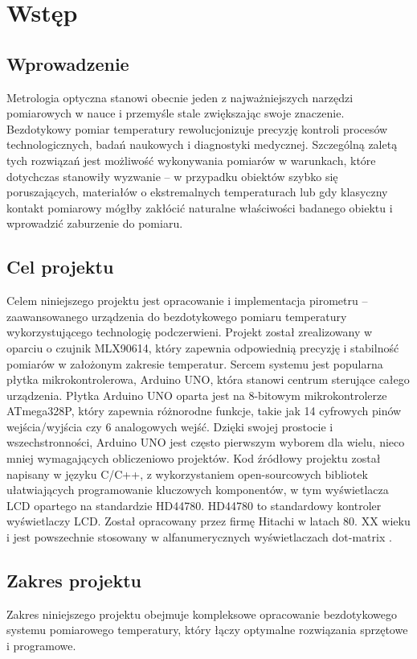 \chapter{Wstęp}
    \section{Wprowadzenie}
    Metrologia optyczna stanowi obecnie jeden z najważniejszych narzędzi pomiarowych w nauce i przemyśle stale zwiększając swoje znaczenie. Bezdotykowy pomiar temperatury rewolucjonizuje precyzję kontroli procesów technologicznych, badań naukowych i diagnostyki medycznej. Szczególną zaletą tych rozwiązań jest możliwość wykonywania pomiarów w warunkach, które dotychczas stanowiły wyzwanie – w przypadku obiektów szybko się poruszających, materiałów o ekstremalnych temperaturach lub gdy klasyczny kontakt pomiarowy mógłby zakłócić naturalne właściwości badanego obiektu i wprowadzić zaburzenie do pomiaru.
    \section{Cel projektu}
    Celem niniejszego projektu jest opracowanie i implementacja pirometru – zaawansowanego urządzenia do bezdotykowego pomiaru temperatury wykorzystującego technologię podczerwieni. Projekt został zrealizowany w oparciu o czujnik MLX90614, który zapewnia odpowiednią precyzję i stabilność pomiarów w założonym zakresie temperatur. Sercem systemu jest popularna płytka mikrokontrolerowa, Arduino UNO, która stanowi centrum sterujące całego urządzenia. Płytka Arduino UNO oparta jest na 8-bitowym mikrokontrolerze ATmega328P, który zapewnia różnorodne funkcje, takie jak 14 cyfrowych pinów wejścia/wyjścia czy 6 analogowych wejść. Dzięki swojej prostocie i wszechstronności, Arduino UNO jest często pierwszym wyborem dla wielu, nieco mniej wymagających obliczeniowo projektów. Kod źródłowy projektu został napisany w języku C/C++, z wykorzystaniem open-sourcowych bibliotek ułatwiających programowanie kluczowych komponentów, w tym wyświetlacza LCD opartego na standardzie HD44780. HD44780 to standardowy kontroler wyświetlaczy LCD. Został opracowany przez firmę Hitachi w latach 80. XX wieku i jest powszechnie stosowany w alfanumerycznych wyświetlaczach dot-matrix \cite{1}.
    \section{Zakres projektu}
    Zakres niniejszego projektu obejmuje kompleksowe opracowanie bezdotykowego systemu pomiarowego temperatury, który łączy optymalne rozwiązania sprzętowe i programowe.